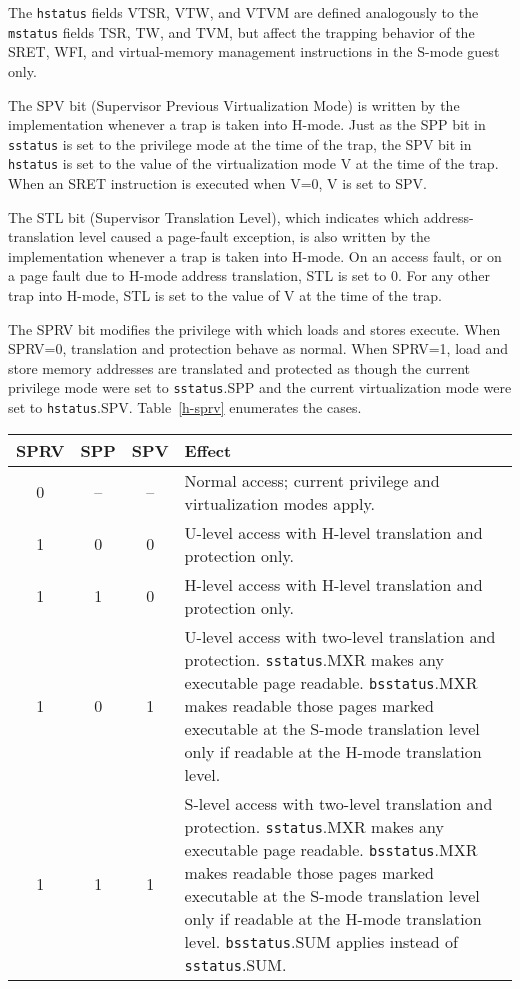 The {\tt hstatus} fields VTSR, VTW, and VTVM are defined analogously to the
{\tt mstatus} fields TSR, TW, and TVM, but affect the trapping behavior of the
SRET, WFI, and virtual-memory management instructions in the S-mode guest
only.

The SPV bit (Supervisor Previous Virtualization Mode) is written by the implementation
whenever a trap is taken into H-mode.  Just as the SPP bit in {\tt sstatus} is set to the privilege
mode at the time of the trap, the SPV bit in {\tt hstatus} is set to the value of the virtualization
mode V at the time of the trap.  When an SRET instruction is executed when V=0,
V is set to SPV.

The STL bit (Supervisor Translation Level), which indicates which address-translation level
caused a page-fault exception, is also written by the implementation whenever a trap
is taken into H-mode.  On an access fault, or on a page fault due to H-mode address
translation, STL is set to 0.  For any other trap into H-mode, STL is set to the value
of V at the time of the trap.

The SPRV bit modifies the privilege with which loads and stores execute.
When SPRV=0, translation and protection behave as normal.  When SPRV=1,
load and store memory addresses are translated and protected as though
the current privilege mode were set to {\tt sstatus}.SPP and the current
virtualization mode were set to {\tt hstatus}.SPV.
Table~\ref{h-sprv} enumerates the cases.

\begin{table*}[h!]
\begin{center}
\begin{tabular}{|c|c|c||p{5in}|}
  \hline
   SPRV & SPP & SPV & Effect \\ \hline \hline
   0    & --  & -- & Normal access; current privilege and virtualization modes apply. \\ \hline
   1    & 0   & 0  & U-level access with H-level translation and protection only. \\ \hline
   1    & 1   & 0  & H-level access with H-level translation and protection only. \\ \hline
   1    & 0   & 1  & U-level access with two-level translation and protection. {\tt sstatus}.MXR makes any executable page readable.  {\tt bsstatus}.MXR makes readable those pages marked executable at the S-mode translation level only if readable at the H-mode translation level. \\ \hline
   1    & 1   & 1  & S-level access with two-level translation and protection. {\tt sstatus}.MXR makes any executable page readable.  {\tt bsstatus}.MXR makes readable those pages marked executable at the S-mode translation level only if readable at the H-mode translation level. {\tt bsstatus}.SUM applies instead of {\tt sstatus}.SUM. \\ \hline
 \end{tabular}
\end{center}
\caption{Effect on load and store translation and protection under SPRV.}
\label{h-sprv}
\end{table*}

